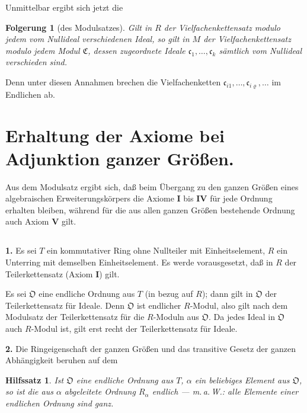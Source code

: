 \documentclass[12pt,a4paper]{article}
\newcommand{\fC}{\mathfrak{C}}
\newcommand{\fO}{\mathfrak{O}}
\theoremstyle{plain}
\newtheorem{Hilfssatz}[Satz]{Hilfssatz}
\newtheorem{Folgerung}[Satz]{Folgerung}
\theoremstyle{definition}
\theoremstyle{remark}
\begin{document}
Unmittelbar ergibt sich jetzt die
\begin{Folgerung}[des Modulsatzes]
Gilt in $R$ der Vielfachenkettensatz modulo jedem vom Nullideal verschiedenen Ideal, so gilt in $M$ der Vielfachenkettensatz modulo jedem Modul $\fC$, dessen zugeordnete Ideale $\mathfrak{c}_{1},\dots,\mathfrak{c}_{k}$ sämtlich vom Nullideal verschieden sind.
\end{Folgerung}
Denn unter diesen Annahmen brechen die Vielfachenketten $\mathfrak{c}_{i1},\dots,\mathfrak{c}_{i\varrho},\dots$ im Endlichen ab.

\newpage
\section{Erhaltung der Axiome bei Adjunktion ganzer Größen.}

\noindent
Aus dem Modulsatz ergibt sich, daß beim Übergang zu den ganzen Größen eines algebraischen Erweiterungskörpers die Axiome \textbf{I} bis \textbf{IV} für jede Ordnung erhalten bleiben, während für die aus allen ganzen Größen bestehende Ordnung auch Axiom \textbf{V} gilt.

\setcounter{Satz}{0}
\subsection{}

\noindent
\textbf{1.} Es sei $T$ ein kommutativer Ring ohne Nullteiler mit Einheitselement, $R$ ein Unterring mit demselben Einheitselement. Es werde vorausgesetzt, daß in $R$ der Teilerkettensatz (Axiom \textbf{I}) gilt.

Es sei $\fO$ eine endliche Ordnung aus $T$ (in bezug auf $R$); dann gilt in $\fO$ der Teilerkettensatz für Ideale. Denn $\fO$ ist endlicher $R$-Modul, also gilt nach dem Modulsatz der Teilerkettensatz für die $R$-Moduln aus $\fO$. Da jedes Ideal in $\fO$ auch $R$-Modul ist, gilt erst recht der Teilerkettensatz für Ideale.

\medskip
\noindent
\textbf{2.} Die Ringeigenschaft der ganzen Größen und das transitive Gesetz der ganzen Abhängigkeit beruhen auf dem

\begin{Hilfssatz}
Ist $\fO$ eine endliche Ordnung aus $T$, $\alpha$ ein beliebiges Element aus $\fO$, so ist die aus $\alpha$ abgeleitete Ordnung $R_{\alpha}$ endlich --- m.\,a.\,W.: alle Elemente einer endlichen Ordnung sind ganz.
\end{Hilfssatz}
\end{document}

